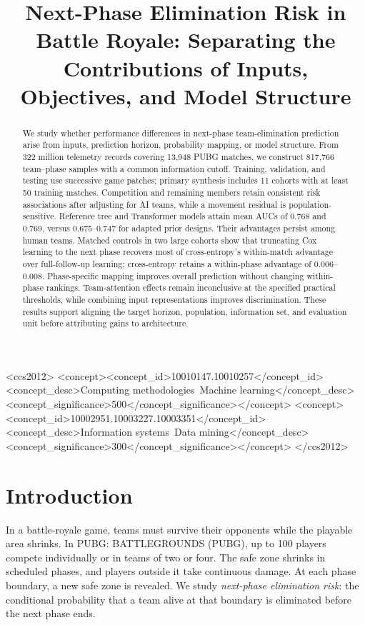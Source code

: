 \documentclass[sigconf,anonymous,nonacm]{acmart}
\begin{document}
\title[Next-Phase Elimination Risk in Battle Royale]{Next-Phase Elimination Risk in Battle Royale: Separating the Contributions of Inputs, Objectives, and Model Structure}
\begin{abstract}
We study whether performance differences in next-phase team-elimination prediction arise from inputs, prediction horizon, probability mapping, or model structure. From 322 million telemetry records covering 13,948 PUBG matches, we construct 817,766 team--phase samples with a common information cutoff. Training, validation, and testing use successive game patches; primary synthesis includes 11 cohorts with at least 50 training matches. Competition and remaining members retain consistent risk associations after adjusting for AI teams, while a movement residual is population-sensitive. Reference tree and Transformer models attain mean AUCs of 0.768 and 0.769, versus 0.675--0.747 for adapted prior designs. Their advantages persist among human teams. Matched controls in two large cohorts show that truncating Cox learning to the next phase recovers most of cross-entropy's within-match advantage over full-follow-up learning; cross-entropy retains a within-phase advantage of 0.006--0.008. Phase-specific mapping improves overall prediction without changing within-phase rankings. Team-attention effects remain inconclusive at the specified practical thresholds, while combining input representations improves discrimination. These results support aligning the target horizon, population, information set, and evaluation unit before attributing gains to architecture.
\end{abstract}
\begin{CCSXML}
<ccs2012>
<concept><concept_id>10010147.10010257</concept_id><concept_desc>Computing methodologies~Machine learning</concept_desc><concept_significance>500</concept_significance></concept>
<concept><concept_id>10002951.10003227.10003351</concept_id><concept_desc>Information systems~Data mining</concept_desc><concept_significance>300</concept_significance></concept>
</ccs2012>
\end{CCSXML}
\maketitle
\section{Introduction}
\label{sec:introduction}
In a battle-royale game, teams must survive their opponents while the playable area shrinks. In PUBG: BATTLEGROUNDS (PUBG), up to 100 players compete individually or in teams of two or four. The safe zone shrinks in scheduled phases, and players outside it take continuous damage. At each phase boundary, a new safe zone is revealed. We study \emph{next-phase elimination risk}: the conditional probability that a team alive at that boundary is eliminated before the next phase ends.
\end{document}
